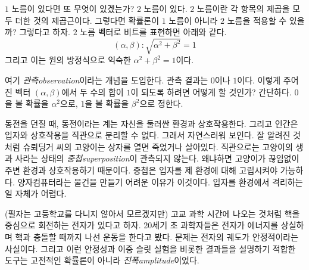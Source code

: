 \documentclass[a4paper,chapter,atbegshi]{oblivoir}
\begin{document}
$1$ 노름이 있다면 또 무엇이 있겠는가? $2$ 노름이 있다. $2$ 노름이란 각 항목의
제곱을 모두 더한 것의 제곱근이다. 그렇다면 확률론이 $1$ 노름이 아니라 $2$ 노름을
적용할 수 있을까? 그렇다고 하자. $2$ 노름 벡터로 비트를 표현하면 아래와 같다.
\begin{equation}
  (\alpha,\beta):\sqrt{\alpha^2+\beta^2}=1
\end{equation}
그리고 이는 원의 방정식으로 익숙한 $\alpha^2+\beta^2=1$이다.  
\begin{center}
\end{center}
여기 \emph{관측\tiny observation}이라는 개념을 도입한다. 관측 결과는 $0$이나
$1$이다. 이렇게 주어진 벡터 $(\alpha,\beta)$에서 두 수의 합이 $1$이 되도록
하려면 어떻게 할 것인가? 간단하다. $0$을 볼 확률을 $\alpha^2$으로, 
$1$을 볼 확률을 $\beta^2$으로 정한다.

동전을 던질 때, 동전이라는 계는 자신을 둘러싼 환경과 상호작용한다. 그리고 인간은
입자와 상호작용을 직관으로 분리할 수 없다. 그래서 자연스러워 보인다. 
잘 알려진 것처럼 슈뢰딩거 씨의 고양이는
상자를 열면 죽었거나 살아있다. 직관으로는 고양이의 생과 사라는 상태의 
\emph{중첩\tiny superposition}이 관측되지 않는다. 왜냐하면 고양이가 끊임없이 
주변 환경과 상호작용하기 때문이다. 중첩은 입자를 제 환경에 대해 고립시켜야
가능하다. 양자컴퓨터라는 물건을 만들기 어려운 이유가 이것이다. 입자를 환경에서
격리하는 일 자체가 어렵다. 

(필자는 고등학교를 다니지 않아서 모르겠지만) 고교 과학 시간에 나오는 것처럼
핵을 중심으로 회전하는 전자가 있다고 하자. 20세기 초 과학자들은 전자가 에너지를
상실하며 핵과 충돌할 때까지 나선 운동을 한다고 봤다. 문제는 전자의 궤도가
안정적이라는 사실이다. 그리고 이런 안정성과 이중 슬릿 실험을 비롯한 결과들을
설명하기 적합한 도구는 고전적인 확률론이 아니라 \emph{진폭\tiny amplitude}이었다.
\end{document}
